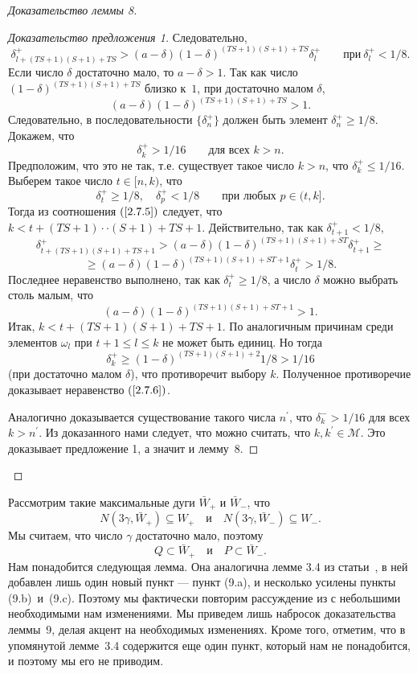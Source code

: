 \documentclass[12pt]{article}
\begin{document}
\begin{proof}[Доказательство леммы 8]
\begin{proof}[Доказательство предложения 1]
Следовательно,
\begin{equation}
\label{2.7.5}
\delta^+_{l+(TS+1)(S+1)+TS}>(a-\delta)(1-\delta)^{(TS+1)(S+1)+TS}\delta^+_l\qquad\textrm{при}\ \delta^+_l<1/8.
\end{equation}
Если число $\delta$ достаточно мало, то $a-\delta>1$. Так как число $(1-\delta)^{(TS+1)(S+1)+TS}$ близко к~$1$, при достаточно малом $\delta$,
$$(a-\delta)(1-\delta)^{(TS+1)(S+1)+TS}>1.$$
Следовательно, в последовательности $\{\delta^+_n\}$ должен быть элемент $\delta^+_n\geq1/8$. Докажем, что
\begin{equation}
\label{2.7.6}
\delta^+_k>1/16\qquad\textrm{для всех\ }k>n.
\end{equation}
Предположим, что это не так, т.е. существует такое число $k>n$, что $\delta^+_k\leq 1/16$. Выберем такое число $t\in[n,k)$, что
$$\delta^+_t\geq1/8,\quad\delta^+_p<1/8\qquad\textrm{при любых }p\in(t,k].$$
Тогда из соотношения $(\ref{2.7.5})$ следует, что $k<t+(TS+1)\cdot\allowbreak\cdot(S+1)+TS+1$. Действительно, так как $\delta^+_{t+1}<1/8$,
$$\delta^+_{t+(TS+1)(S+1)+TS+1}>(a-\delta)(1-\delta)^{(TS+1)(S+1)+ST}\delta^+_{t+1}\geq$$
$$\geq(a-\delta)(1-\delta)^{(TS+1)(S+1)+ST+1}\delta^+_t>1/8.$$ 
Последнее неравенство выполнено, так как $\delta^+_t\geq1/8$, а число $\delta$ можно выбрать столь малым, что
$$(a-\delta)(1-\delta)^{(TS+1)(S+1)+ST+1}>1.$$
Итак, $k<t+(TS+1)(S+1)+TS+1$. По аналогичным причинам среди элементов $\omega_l$ при 
$t+1\leq l\leq k$ не может быть единиц. Но тогда
$$\delta^+_k\geq(1-\delta)^{(TS+1)(S+1)+2}1/8>1/16$$
(при достаточно малом $\delta$), что противоречит выбору $k$. Полученное противоречие доказывает неравенство $(\ref{2.7.6})$.

Аналогично доказывается  существование такого числа $n^{\prime}$, что $\delta^-_k>1/16$ для всех $k>n^{\prime}$. Из доказанного нами следует, что можно считать, что $k,k^{\prime}\in\mathcal{M}$. Это доказывает предложение 1, а значит и лемму~8.
\end{proof}
\end{proof}
Рассмотрим такие максимальные дуги $\bar{W}_+$ и $\bar{W}_{-}$, что
$$N(3\gamma,\bar{W}_+)\subseteq W_+\quad\textrm{и}\quad N(3\gamma,\bar{W}_-)\subseteq W_-.$$
Мы считаем, что число $\gamma$ достаточно мало, поэтому
$$Q\subset \bar{W}_+\quad\textrm{и}\quad P\subset \bar{W}_-.$$
Нам понадобится следующая лемма. Она аналогична лемме 3.4 из статьи~\cite{17}, в ней добавлен лишь один новый пункт --- пункт (9.a), и несколько усилены пункты (9.b)~и~(9.c). Поэтому мы фактически повторим рассуждение из \cite{17} с небольшими необходимыми нам изменениями. Мы приведем лишь набросок доказательства леммы~9, делая акцент на необходимых изменениях. Кроме того, отметим, что в упомянутой лемме~3.4 содержится еще один пункт, который нам не понадобится, и поэтому мы его не приводим. 
\end{document}

